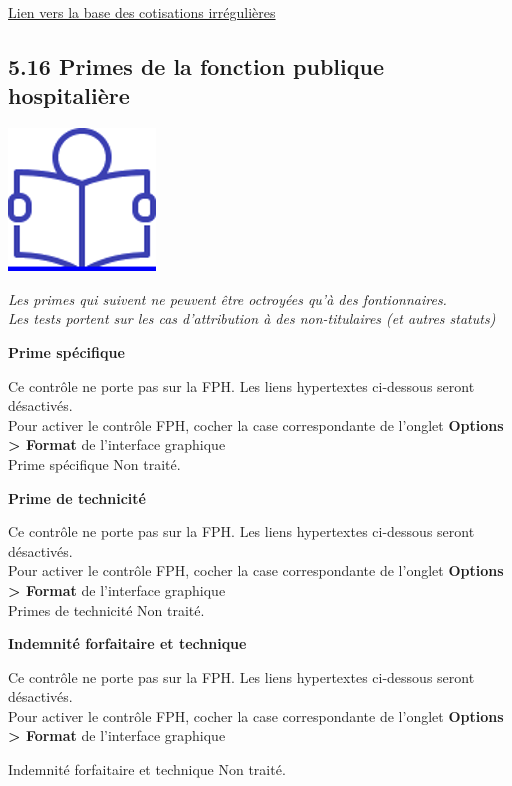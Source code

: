 \href{../Bases/Reglementation/Cotisations.irreg.ircantec.csv}{Lien vers la
base des cotisations irrégulières}

\hypertarget{primes-de-la-fonction-publique-hospitaliere}{%
\subsection{5.16 Primes de la fonction publique
hospitalière}\label{primes-de-la-fonction-publique-hospitaliere}}

\href{../Docs/Notices/fiche_FPH.odt}{\includegraphics{icones/Notice.png}}

\emph{Les primes qui suivent ne peuvent être octroyées qu'à des
fontionnaires.}\\
\emph{Les tests portent sur les cas d'attribution à des non-titulaires
(et autres statuts)}

\textbf{Prime spécifique}

Ce contrôle ne porte pas sur la FPH. Les liens hypertextes ci-dessous
seront désactivés.\\
Pour activer le contrôle FPH, cocher la case correspondante de l'onglet
\textbf{Options \textgreater{} Format} de l'interface graphique\\
Prime spécifique Non traité.

\textbf{Prime de technicité}

Ce contrôle ne porte pas sur la FPH. Les liens hypertextes ci-dessous
seront désactivés.\\
Pour activer le contrôle FPH, cocher la case correspondante de l'onglet
\textbf{Options \textgreater{} Format} de l'interface graphique\\
Primes de technicité Non traité.

\textbf{Indemnité forfaitaire et technique}

Ce contrôle ne porte pas sur la FPH. Les liens hypertextes ci-dessous
seront désactivés.\\
Pour activer le contrôle FPH, cocher la case correspondante de l'onglet
\textbf{Options \textgreater{} Format} de l'interface graphique

Indemnité forfaitaire et technique Non traité.

